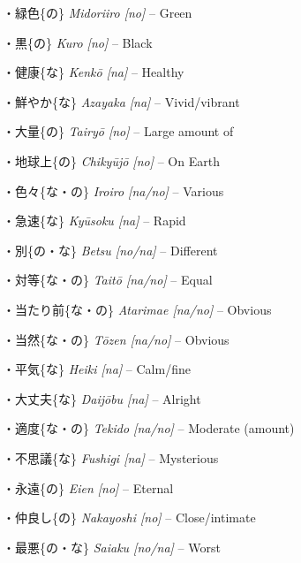 \par{・緑色\{の\} \emph{Midori\textquotesingle iro [no] }– Green }

\par{・黒\{の\} \emph{Kuro [no] }– Black }

\par{・健康\{な\} \emph{Kenkō [na] }– Healthy }

\par{・鮮やか\{な\} \emph{Azayaka [na] }– Vivid\slash vibrant }

\par{・大量\{の\} \emph{Tairyō [no] }– Large amount of }

\par{・地球上\{の\} \emph{Chikyūjō [no] }– On Earth }

\par{・色々\{な・の\} \emph{Iroiro [na\slash no] }– Various }

\par{・急速\{な\} \emph{Kyūsoku [na] }– Rapid }

\par{・別\{の・な\} \emph{Betsu [no\slash na] }– Different }

\par{・対等\{な・の\} \emph{Taitō [na\slash no] }– Equal }

\par{・当たり前\{な・の\} \emph{Atarimae [na\slash no] }– Obvious }

\par{・当然\{な・の\} \emph{Tōzen [na\slash no] }– Obvious }

\par{・平気\{な\} \emph{Heiki [na] }– Calm\slash fine }

\par{・大丈夫\{な\} \emph{Daijōbu [na] }– Alright }

\par{・適度\{な・の\} \emph{Tekido [na\slash no] }– Moderate (amount) }

\par{・不思議\{な\} \emph{Fushigi [na] }– Mysterious }

\par{・永遠\{の\} \emph{Eien [no] }– Eternal }

\par{・仲良し\{の\} \emph{Nakayoshi [no] }– Close\slash intimate }

\par{・最悪\{の・な\} \emph{Saiaku [no\slash na] }– Worst }

